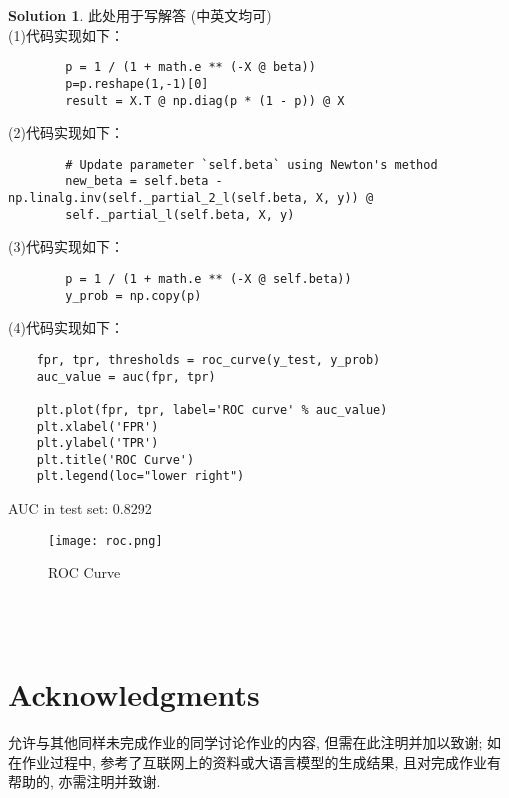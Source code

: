 \documentclass[a4paper,UTF8]{article}
\numberwithin{equation}{section}
\theoremstyle{definition}
\newtheorem*{solution}{Solution}
\begin{document}
\begin{solution}
    此处用于写解答 (中英文均可)
    ~\\
    (1)代码实现如下：
\begin{verbatim}
        p = 1 / (1 + math.e ** (-X @ beta))
        p=p.reshape(1,-1)[0]
        result = X.T @ np.diag(p * (1 - p)) @ X
\end{verbatim}
(2)代码实现如下：
\begin{verbatim}
        # Update parameter `self.beta` using Newton's method
        new_beta = self.beta - np.linalg.inv(self._partial_2_l(self.beta, X, y)) @ 
        self._partial_l(self.beta, X, y)
\end{verbatim}
(3)代码实现如下：
\begin{verbatim}
        p = 1 / (1 + math.e ** (-X @ self.beta))
        y_prob = np.copy(p)
\end{verbatim}
(4)代码实现如下：
\begin{verbatim}
    fpr, tpr, thresholds = roc_curve(y_test, y_prob)
    auc_value = auc(fpr, tpr)

    plt.plot(fpr, tpr, label='ROC curve' % auc_value)
    plt.xlabel('FPR')
    plt.ylabel('TPR')
    plt.title('ROC Curve')
    plt.legend(loc="lower right")
\end{verbatim}
AUC in test set: 0.8292\\
\begin{figure}[H]
    \centering
    \texttt{[image: roc.png]}\\
    \caption{ROC Curve}
    \label{fig:roc}
\end{figure}
    ~\\
    ~\\
\end{solution}


\newpage
\section*{Acknowledgments}
允许与其他同样未完成作业的同学讨论作业的内容, 但需在此注明并加以致谢; 如在作业过程中, 参考了互联网上的资料或大语言模型的生成结果, 且对完成作业有帮助的, 亦需注明并致谢.
\end{document}
